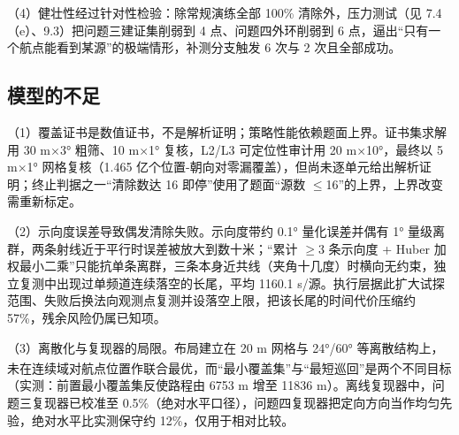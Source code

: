 \documentclass[12pt,a4paper]{ctexart}
\newcommand{\upcite}[1]{\textsuperscript{\cite{#1}}}
\begin{document}
\begin{table}[htbp]
\centering
\caption{问题三、问题四的最终效果}\label{tab:effect}
{}
\end{table}



（4）健壮性经过针对性检验：除常规演练全部 100\% 清除外，压力测试（见 7.4（e）、9.3）把问题三建证集削弱到 4 点、问题四外环削弱到 6 点，逼出“只有一个航点能看到某源”的极端情形，补测分支触发 6 次与 2 次且全部成功。

\subsection{模型的不足}

（1）覆盖证书是数值证书，不是解析证明；策略性能依赖题面上界。证书集求解用 30 m$\times$3° 粗筛、10 m$\times$1° 复核，L2/L3 可定位性审计用 20 m$\times$10°，最终以 5 m$\times$1° 网格复核（1.465 亿个位置-朝向对零漏覆盖），但尚未逐单元给出解析证明；终止判据之一“清除数达 16 即停”使用了题面“源数 $\le$16”的上界，上界改变需重新标定。

（2）示向度误差导致偶发清除失败。示向度带约 0.1° 量化误差并偶有 1° 量级离群，两条射线近于平行时误差被放大到数十米；“累计 $\ge$3 条示向度 + Huber 加权最小二乘”只能抗单条离群，三条本身近共线（夹角十几度）时横向无约束，独立复测中出现过单频道连续落空的长尾，平均 1160.1 s/源。执行层据此扩大试探范围、失败后换法向观测点复测并设落空上限，把该长尾的时间代价压缩约 57\%，残余风险仍属已知项。

（3）离散化与复现器的局限。布局建立在 20 m 网格与 24°/60° 等离散结构上，未在连续域对航点位置作联合最优，而“最小覆盖集”与“最短巡回\upcite{ref:Dijkstra}”是两个不同目标（实测：前置最小覆盖集反使路程由 6753 m 增至 11836 m）。离线复现器中，问题三复现器已校准至 0.5\%（绝对水平口径），问题四复现器把定向方向当作均匀先验，绝对水平比实测保守约 12\%，仅用于相对比较。
\end{document}
